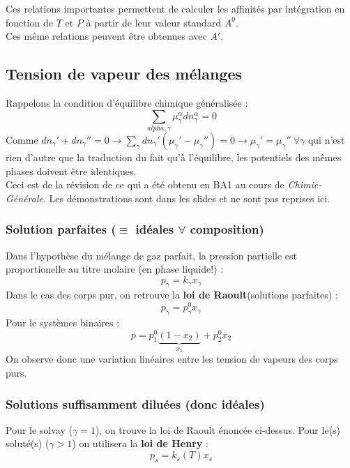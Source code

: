 \documentclass[11pt, a4paper, openany]{book}
\begin{document}
		Ces relations importantes permettent de calculer les affinités par intégration en fonction de $T$ et $P$ à partir de leur valeur standard $A^0$.\\
		
		Ces même relations peuvent être obtenues avec $A'$.
		
		
		\subsection{Tension de vapeur des mélanges}
		Rappelons la condition d'équilibre chimique généralisée :
		\begin{equation}
			\sum_{alpha, \gamma} \mu_\gamma^\alpha dn_\gamma^\alpha = 0
		\end{equation}
		Comme $dn_\gamma ' + dn_\gamma '' = 0 \rightarrow \sum_\gamma dn_\gamma ' (\mu_\gamma ' - \mu_\gamma '') = 0 \rightarrow \mu_\gamma ' = \mu_\gamma ''\ \forall \gamma$ qui n'est rien d'autre que la traduction du fait qu'à l'équilibre, les potentiels des mêmes phases doivent être identiques.\\
		
		Ceci est de la révision de ce qui a été obtenu en BA1 au cours de \textit{Chimie-Générale}. Les démonstrations sont dans les slides et ne sont pas reprises ici.
		\subsubsection{Solution parfaites ($\equiv$ idéales $\forall$ composition)}
		Dans l'hypothèse du mélange de gaz parfait, la pression partielle est proportionelle au titre molaire (en phase liquide!) :
		\begin{equation}
			p_\gamma = k_\gamma x_\gamma
		\end{equation}
		Dans le cas des corps pur, on retrouve la \textbf{loi de Raoult}(solutions parfaites) : 
		\begin{equation}
			p_\gamma = p^0_\gamma x_\gamma
		\end{equation}
		Pour le systèmes binaires : 
		\begin{equation}
			p = p^0_1\underbrace{(1-x_2)}_{x_1} + p_2^0x_2
		\end{equation}
		On observe donc une variation linéaires entre les tension de vapeurs des corps purs.
		
		\subsubsection{Solutions suffisamment diluées (donc idéales)}
		Pour le solvay ($\gamma = 1$), on trouve la loi de Raoult énoncée ci-dessus. Pour le(s) soluté(s) ($\gamma > 1$) on utilisera la \textbf{loi de Henry} :
		\begin{equation}
			p_s = k_s(T)x_s
		\end{equation}
		
\end{document}
